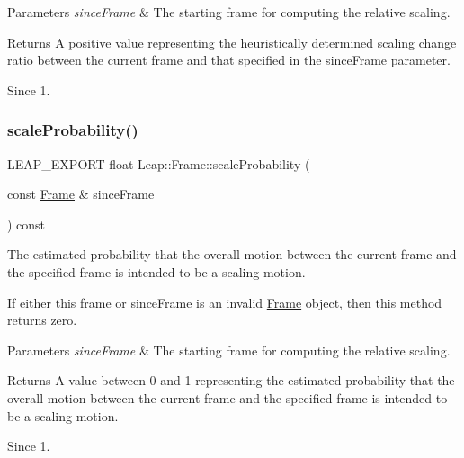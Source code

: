 \begin{DoxyParams}{Parameters}
{\em since\+Frame} & The starting frame for computing the relative scaling. \\
\hline
\end{DoxyParams}
\begin{DoxyReturn}{Returns}
A positive value representing the heuristically determined scaling change ratio between the current frame and that specified in the since\+Frame parameter. 
\end{DoxyReturn}
\begin{DoxySince}{Since}
1. 
\end{DoxySince}
\mbox{\label{class_leap_1_1_frame_acebab65173cf11a44c6064e1a1cfd01f}} 
\subsubsection{\texorpdfstring{scale\+Probability()}{scaleProbability()}}
{\footnotesize\ttfamily L\+E\+A\+P\+\_\+\+E\+X\+P\+O\+RT float Leap\+::\+Frame\+::scale\+Probability (\begin{DoxyParamCaption}\item[{const \hyperlink{class_leap_1_1_frame}{Frame} \&}]{since\+Frame }\end{DoxyParamCaption}) const}

The estimated probability that the overall motion between the current frame and the specified frame is intended to be a scaling motion.


\begin{DoxyCodeInclude}
\end{DoxyCodeInclude}


If either this frame or since\+Frame is an invalid \hyperlink{class_leap_1_1_frame}{Frame} object, then this method returns zero.


\begin{DoxyParams}{Parameters}
{\em since\+Frame} & The starting frame for computing the relative scaling. \\
\hline
\end{DoxyParams}
\begin{DoxyReturn}{Returns}
A value between 0 and 1 representing the estimated probability that the overall motion between the current frame and the specified frame is intended to be a scaling motion. 
\end{DoxyReturn}
\begin{DoxySince}{Since}
1. 
\end{DoxySince}
\mbox{\label{class_leap_1_1_frame_ad1620c4e860ce7568526afdf48a0a63b}} 

